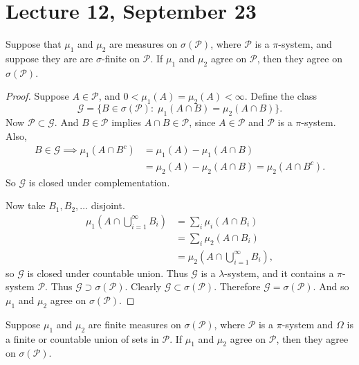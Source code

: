 \documentclass[11pt,fleqn]{book} %
\begin{document}
\section{Lecture 12, September 23}

\begin{theorem} \label{thm:general-measure-agree}
	Suppose that $\mu_1$ and $\mu_2$ are measures on $\sigma(\mathcal{P})$, where $\mathcal{P}$ is a $\pi$-system, and suppose they are are $\sigma$-finite on $\mathcal{P}$. If $\mu_1$ and $\mu_2$ agree on $\mathcal{P}$, then they agree on $\sigma(\mathcal{P})$.
\end{theorem}

\begin{proof}
	Suppose $A \in \mathcal{P}$, and $0 < \mu_1(A) = \mu_2(A) < \infty$. Define the class
	\[
		\mathcal{G} = \{B \in \sigma(\mathcal{P}):\;\mu_1(A \cap B) = \mu_2(A \cap B)\}.
	\]
	Now $\mathcal{P} \subset \mathcal{G}$. And $B \in \mathcal{P}$ implies $A \cap B \in \mathcal{P}$, since $A \in \mathcal{P}$ and $\mathcal{P}$ is a $\pi$-system. Also,
	\begin{align*}
		B \in \mathcal{G} \implies \mu_1(A \cap B^c) &= \mu_1(A) - \mu_1(A \cap B) \\
		&= \mu_2(A) - \mu_2(A \cap B) = \mu_2(A \cap B^c).
	\end{align*}
	So $\mathcal{G}$ is closed under complementation.

	Now take $B_1,B_2,\dots$ disjoint.
	\begin{align*}
		\mu_1 \left( A \cap \bigcup_{i=1}^\infty B_i \right) &= \sum_i \mu_i(A \cap B_i) \\
		&= \sum_i \mu_2(A \cap B_i) \\
		&= \mu_2 \left( A \cap \bigcup_{i=1}^\infty B_i \right),
	\end{align*}
	so $\mathcal{G}$ is closed under countable union. Thus $\mathcal{G}$ is a $\lambda$-system, and it contains a $\pi$-system $\mathcal{P}$. Thus $\mathcal{G} \supset \sigma(\mathcal{P})$. Clearly $\mathcal{G} \subset \sigma(\mathcal{P})$. Therefore $\mathcal{G}=\sigma(\mathcal{P})$. And so $\mu_1$ and $\mu_2$ agree on $\sigma(\mathcal{P})$.
\end{proof}

\begin{theorem} \label{thm:general-measure-agree-2}
	Suppose $\mu_1$ and $\mu_2$ are finite measures on $\sigma(\mathcal{P})$, where $\mathcal{P}$ is a $\pi$-system and $\Omega$ is a finite or countable union of sets in $\mathcal{P}$. If $\mu_1$ and $\mu_2$ agree on $\mathcal{P}$, then they agree on $\sigma(\mathcal{P})$.
\end{theorem}
\end{document}
